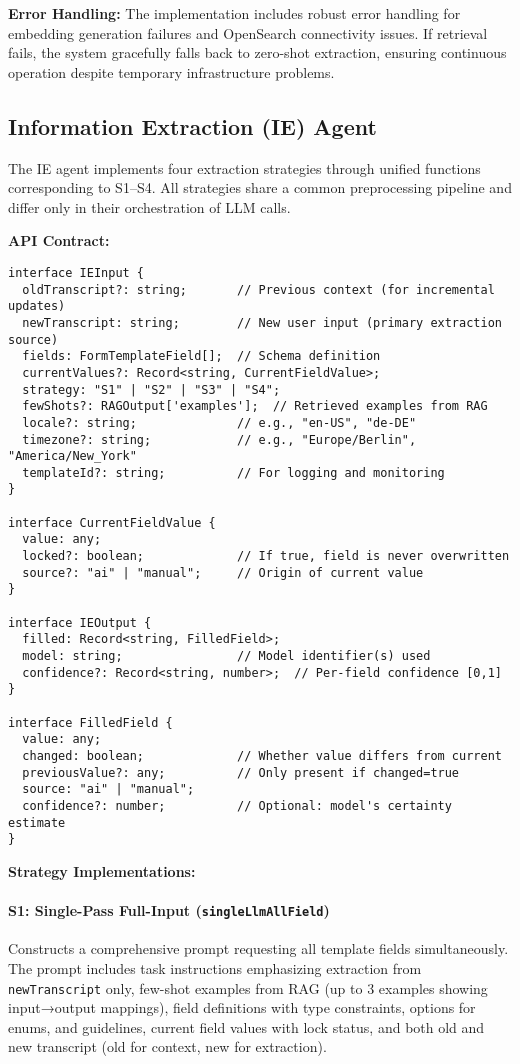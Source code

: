 \textbf{Error Handling:} The implementation includes robust error handling for embedding generation failures and OpenSearch connectivity issues. If retrieval fails, the system gracefully falls back to zero-shot extraction, ensuring continuous operation despite temporary infrastructure problems.


\subsection{Information Extraction (IE) Agent}
\label{subsec:impl-ie}

The IE agent implements four extraction strategies through unified functions corresponding to S1–S4. All strategies share a common preprocessing pipeline and differ only in their orchestration of LLM calls.

\textbf{API Contract:}
\begin{verbatim}
interface IEInput {
  oldTranscript?: string;       // Previous context (for incremental updates)
  newTranscript: string;        // New user input (primary extraction source)
  fields: FormTemplateField[];  // Schema definition
  currentValues?: Record<string, CurrentFieldValue>;
  strategy: "S1" | "S2" | "S3" | "S4";
  fewShots?: RAGOutput['examples'];  // Retrieved examples from RAG
  locale?: string;              // e.g., "en-US", "de-DE"
  timezone?: string;            // e.g., "Europe/Berlin", "America/New_York"
  templateId?: string;          // For logging and monitoring
}

interface CurrentFieldValue {
  value: any;
  locked?: boolean;             // If true, field is never overwritten
  source?: "ai" | "manual";     // Origin of current value
}

interface IEOutput {
  filled: Record<string, FilledField>;
  model: string;                // Model identifier(s) used
  confidence?: Record<string, number>;  // Per-field confidence [0,1]
}

interface FilledField {
  value: any;
  changed: boolean;             // Whether value differs from current
  previousValue?: any;          // Only present if changed=true
  source: "ai" | "manual";
  confidence?: number;          // Optional: model's certainty estimate
}
\end{verbatim}

\textbf{Strategy Implementations:}

\paragraph{S1: Single-Pass Full-Input (\texttt{singleLlmAllField})}
Constructs a comprehensive prompt requesting all template fields simultaneously. The prompt includes task instructions emphasizing extraction from \texttt{newTranscript} only, few-shot examples from RAG (up to 3 examples showing input→output mappings), field definitions with type constraints, options for enums, and guidelines, current field values with lock status, and both old and new transcript (old for context, new for extraction).

